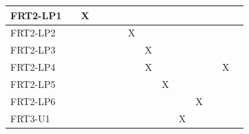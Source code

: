 \documentclass[12pt, titlepage]{article}
\begin{document}
\begin{table}[ht]
{\begin{tabular}{llllllllllllll}
\multicolumn{1}{|l|}{FRT2-LP1}   & \multicolumn{1}{l|}{}  & \multicolumn{1}{l|}{X} & \multicolumn{1}{l|}{}  & \multicolumn{1}{l|}{}  & \multicolumn{1}{l|}{}  & \multicolumn{1}{l|}{}  & \multicolumn{1}{l|}{}  & \multicolumn{1}{l|}{}  & \multicolumn{1}{l|}{}  & \multicolumn{1}{l|}{}   & \multicolumn{1}{l|}{}   & \multicolumn{1}{l|}{}   & \multicolumn{1}{l|}{}   \\ \hline
\multicolumn{1}{|l|}{FRT2-LP2}   & \multicolumn{1}{l|}{}  & \multicolumn{1}{l|}{}  & \multicolumn{1}{l|}{}  & \multicolumn{1}{l|}{}  & \multicolumn{1}{l|}{}  & \multicolumn{1}{l|}{X} & \multicolumn{1}{l|}{}  & \multicolumn{1}{l|}{}  & \multicolumn{1}{l|}{}  & \multicolumn{1}{l|}{}   & \multicolumn{1}{l|}{}   & \multicolumn{1}{l|}{}   & \multicolumn{1}{l|}{}   \\ \hline
\multicolumn{1}{|l|}{FRT2-LP3}   & \multicolumn{1}{l|}{}  & \multicolumn{1}{l|}{}  & \multicolumn{1}{l|}{}  & \multicolumn{1}{l|}{}  & \multicolumn{1}{l|}{}  & \multicolumn{1}{l|}{}  & \multicolumn{1}{l|}{X} & \multicolumn{1}{l|}{}  & \multicolumn{1}{l|}{}  & \multicolumn{1}{l|}{}   & \multicolumn{1}{l|}{}   & \multicolumn{1}{l|}{}   & \multicolumn{1}{l|}{}   \\ \hline
\multicolumn{1}{|l|}{FRT2-LP4}   & \multicolumn{1}{l|}{}  & \multicolumn{1}{l|}{}  & \multicolumn{1}{l|}{}  & \multicolumn{1}{l|}{}  & \multicolumn{1}{l|}{}  & \multicolumn{1}{l|}{}  & \multicolumn{1}{l|}{X} & \multicolumn{1}{l|}{}  & \multicolumn{1}{l|}{}  & \multicolumn{1}{l|}{}   & \multicolumn{1}{l|}{}   & \multicolumn{1}{l|}{X}  & \multicolumn{1}{l|}{}   \\ \hline
\multicolumn{1}{|l|}{FRT2-LP5}   & \multicolumn{1}{l|}{}  & \multicolumn{1}{l|}{}  & \multicolumn{1}{l|}{}  & \multicolumn{1}{l|}{}  & \multicolumn{1}{l|}{}  & \multicolumn{1}{l|}{}  & \multicolumn{1}{l|}{}  & \multicolumn{1}{l|}{X} & \multicolumn{1}{l|}{}  & \multicolumn{1}{l|}{}   & \multicolumn{1}{l|}{}   & \multicolumn{1}{l|}{}   & \multicolumn{1}{l|}{}   \\ \hline
\multicolumn{1}{|l|}{FRT2-LP6}   & \multicolumn{1}{l|}{}  & \multicolumn{1}{l|}{}  & \multicolumn{1}{l|}{}  & \multicolumn{1}{l|}{}  & \multicolumn{1}{l|}{}  & \multicolumn{1}{l|}{}  & \multicolumn{1}{l|}{}  & \multicolumn{1}{l|}{}  & \multicolumn{1}{l|}{}  & \multicolumn{1}{l|}{X}  & \multicolumn{1}{l|}{}   & \multicolumn{1}{l|}{}   & \multicolumn{1}{l|}{}   \\ \hline
\multicolumn{1}{|l|}{FRT3-U1}    & \multicolumn{1}{l|}{}  & \multicolumn{1}{l|}{}  & \multicolumn{1}{l|}{}  & \multicolumn{1}{l|}{}  & \multicolumn{1}{l|}{}  & \multicolumn{1}{l|}{}  & \multicolumn{1}{l|}{}  & \multicolumn{1}{l|}{}  & \multicolumn{1}{l|}{X} & \multicolumn{1}{l|}{}   & \multicolumn{1}{l|}{}   & \multicolumn{1}{l|}{}   & \multicolumn{1}{l|}{}   \\ \hline

\end{tabular}}
\end{table}
\end{document}

